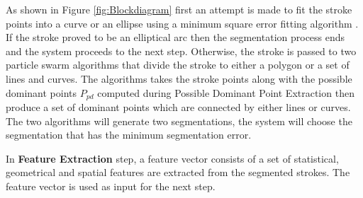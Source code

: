  As shown in Figure \ref{fig:Blockdiagram} first an attempt is made to fit the stroke points into a curve or an ellipse using a minimum square error fitting algorithm \cite{chernov-2003}. If the stroke proved to be an elliptical arc then the segmentation process ends and the system proceeds to the next step. Otherwise, the stroke is passed to two particle swarm algorithms that divide the stroke to either a polygon or a set of lines and curves. The algorithms takes the stroke points along with the possible dominant points $P_{pd}$ computed during Possible Dominant Point Extraction then produce a set of dominant points which are connected by either lines or curves. The two algorithms will generate two segmentations, the system will choose the segmentation that has the minimum segmentation error.%

 
 In \textbf{Feature Extraction} step, a feature vector consists of a set of statistical, geometrical and spatial features are extracted from the segmented strokes. The feature vector is used as input for the next step.   %
  
